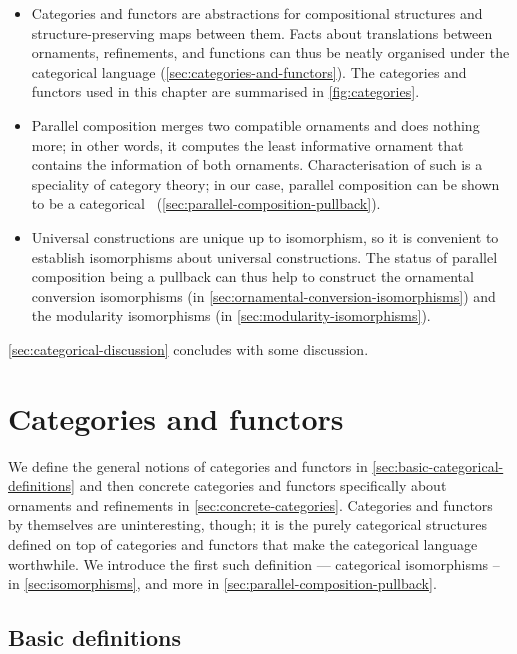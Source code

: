\begin{itemize}
\item Categories and functors are abstractions for compositional structures and structure-preserving maps between them.
Facts about translations between ornaments, refinements, and functions can thus be neatly organised under the categorical language (\autoref{sec:categories-and-functors}).
The categories and functors used in this chapter are summarised in \autoref{fig:categories}.
\item Parallel composition merges two compatible ornaments and does nothing more; in other words, it computes the least informative ornament that contains the information of both ornaments.
Characterisation of such  is a speciality of category theory; in our case, parallel composition can be shown to be a categorical ~(\autoref{sec:parallel-composition-pullback}).
\item Universal constructions are unique up to isomorphism, so it is convenient to establish isomorphisms about universal constructions.
The status of parallel composition being a pullback can thus help to construct the ornamental conversion isomorphisms (in \autoref{sec:ornamental-conversion-isomorphisms}) and the modularity isomorphisms (in \autoref{sec:modularity-isomorphisms}).
\end{itemize}
\autoref{sec:categorical-discussion} concludes with some discussion.

\section{Categories and functors}
\label{sec:categories-and-functors}

We define the general notions of categories and functors in \autoref{sec:basic-categorical-definitions} and then concrete categories and functors specifically about ornaments and refinements in \autoref{sec:concrete-categories}.
Categories and functors by themselves are uninteresting, though; it is the purely categorical structures defined on top of categories and functors that make the categorical language worthwhile.
We introduce the first such definition --- categorical isomorphisms -- in \autoref{sec:isomorphisms}, and more in \autoref{sec:parallel-composition-pullback}.

\subsection{Basic definitions}
\label{sec:basic-categorical-definitions}

